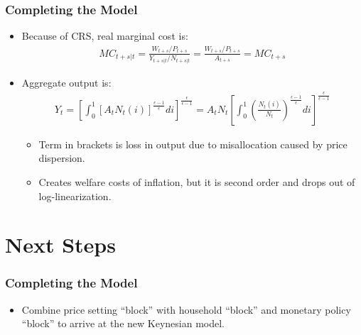 \documentclass[english,xcolor=svgnames]{beamer}
\begin{document}
\begin{frame}
\frametitle{Completing the Model
}
\begin{itemize}
	\item Because of CRS, real marginal cost is:
	\begin{align*}
		MC_{t+s|t}=\frac{W_{t+s}/P_{t+s}}{Y_{t+s|t}/N_{t+s|t}}=\frac{W_{t+s}/P_{t+s}}{A_{t+s}}=MC_{t+s}
	\end{align*}
	\item Aggregate output is:
	\begin{align*}
Y_t=\left[\int_0^1[A_tN_t(i)]^{\frac{\epsilon-1}{\epsilon}}di\right]^{\frac{\epsilon}{\epsilon-1}}=A_tN_t\left[\int_0^1\left(\frac{N_t(i)}{N_t}\right)^{\frac{\epsilon-1}{\epsilon}}di\right]^{\frac{\epsilon}{\epsilon-1}}
	\end{align*}
\begin{itemize}
	\item Term in brackets is loss in output due to misallocation caused by price dispersion.
	\item Creates welfare costs of inflation, but it is second order and drops out of log-linearization.
\end{itemize}
\end{itemize}
\end{frame}

\section{Next Steps}

\begin{frame}
\frametitle{Completing the Model
}
\begin{itemize}
	\item Combine price setting ``block'' with household ``block'' and monetary policy ``block'' to arrive at the new Keynesian model.
\end{itemize}
\end{frame}
\end{document}
